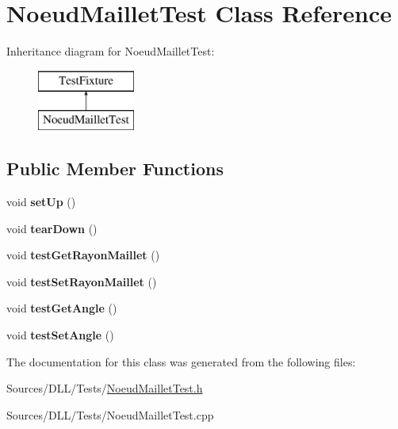 \hypertarget{class_noeud_maillet_test}{}\section{Noeud\+Maillet\+Test Class Reference}
\label{class_noeud_maillet_test}
Inheritance diagram for Noeud\+Maillet\+Test\+:\begin{figure}[H]
\begin{center}
\leavevmode
\includegraphics[height=2.000000cm]{class_noeud_maillet_test}
\end{center}
\end{figure}
\subsection*{Public Member Functions}
\begin{DoxyCompactItemize}
\item 
void {\bfseries set\+Up} ()
\item 
void {\bfseries tear\+Down} ()
\item 
void {\bfseries test\+Get\+Rayon\+Maillet} ()
\item 
void {\bfseries test\+Set\+Rayon\+Maillet} ()
\item 
void {\bfseries test\+Get\+Angle} ()
\item 
void {\bfseries test\+Set\+Angle} ()
\end{DoxyCompactItemize}


The documentation for this class was generated from the following files\+:\begin{DoxyCompactItemize}
\item 
Sources/\+D\+L\+L/\+Tests/\hyperlink{_noeud_maillet_test_8h}{Noeud\+Maillet\+Test.\+h}\item 
Sources/\+D\+L\+L/\+Tests/Noeud\+Maillet\+Test.\+cpp\end{DoxyCompactItemize}
